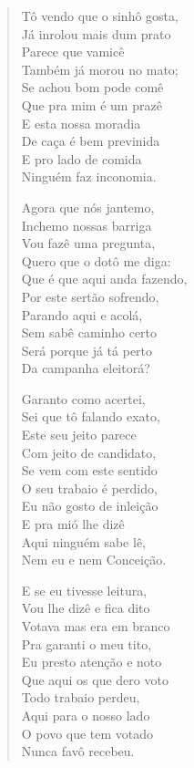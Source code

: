 \begin{verse}
Tô vendo que o sinhô gosta,\\
Já inrolou mais dum prato\\
Parece que vamicê\\
Também já morou no mato;\\
Se achou bom pode comê\\
Que pra mim é um prazê\\
E esta nossa moradia\\
De caça é bem previnida\\
E pro lado de comida\\
Ninguém faz inconomia.

Agora que nós jantemo,\\
Inchemo nossas barriga\\
Vou fazê uma pregunta,\\
Quero que o dotô me diga:\\
Que é que aqui anda fazendo,\\
Por este sertão sofrendo,\\
Parando aqui e acolá,\\
Sem sabê caminho certo\\
Será porque já tá perto\\
Da campanha eleitorá?

Garanto como acertei,\\
Sei que tô falando exato,\\
Este seu jeito parece\\
Com jeito de candidato,\\
Se vem com este sentido\\
O seu trabaio é perdido,\\
Eu não gosto de inleição\\
E pra mió lhe dizê\\
Aqui ninguém sabe lê,\\
Nem eu e nem Conceição.

E se eu tivesse leitura,\\
Vou lhe dizê e fica dito\\
Votava mas era em branco\\
Pra garanti o meu tito,\\
Eu presto atenção e noto\\
Que aqui os que dero voto\\
Todo trabaio perdeu,\\
Aqui para o nosso lado\\
O povo que tem votado\\
Nunca favô recebeu.


\end{verse}
